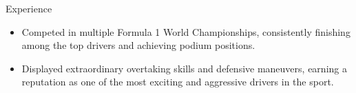 \documentclass{resume} %
\begin{document}
        \begin{workSection}{Experience}
            
            \experienceItem[
                company=Red Bull Racing,
                position=F1 Driver (1st),
                duration=2016-Present
            ]
            
            \begin{itemize}
                \itemsep -6pt {}\item Competed in multiple Formula 1 World Championships, consistently finishing among the top drivers and achieving podium positions.
            \end{itemize}
        
            \experienceItem[
                company=Scuderia Toro Rosso,
                position=F1 Driver (2nd),
                duration=2015-2016
            ]
            
            \begin{itemize}
                \itemsep -6pt {}\item Displayed extraordinary overtaking skills and defensive maneuvers, earning a reputation as one of the most exciting and aggressive drivers in the sport.
            \end{itemize}
        


        \end{workSection}
\end{document}

